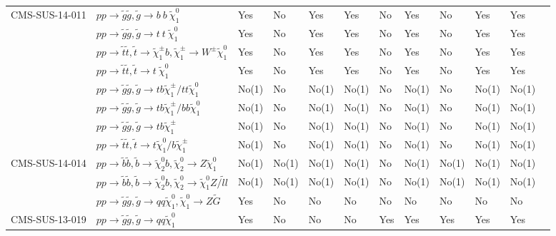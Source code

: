 \documentclass[11pt,A4paper]{article}
\begin{document}
\begin{landscape}
\begin{longtable} {|l|l|l|l|l|l|l|l|l|l|l|l|}
CMS-SUS-14-011 & $pp \rightarrow \tilde{g} \tilde{g}, \tilde{g} \rightarrow b \ b \ \tilde{\chi}_1 ^0 $ & Yes & No & Yes & Yes & No & Yes & No & Yes & Yes & \\
  & $pp \rightarrow \tilde{g} \tilde{g}, \tilde{g}\rightarrow t \ t \ \tilde{\chi}_1 ^0 $ & Yes & No & Yes & Yes & No & Yes & No & Yes & Yes & \\
  & $pp \rightarrow \tilde{t} \tilde{t}, \tilde{t}\rightarrow \tilde{\chi}_1 ^{\pm} b,\tilde{\chi}_1 ^{\pm} \rightarrow W^{\pm} \tilde{\chi}_1 ^0$ & Yes & No & Yes & Yes & No & Yes & No & Yes & Yes & \\
  & $pp \rightarrow \tilde{t} \tilde{t}, \tilde{t}\rightarrow t \ \tilde{\chi}_1 ^0 $ & Yes & No & Yes & Yes & No & Yes & No & Yes & Yes & \\
  & $pp \rightarrow \tilde{g} \tilde{g}, \tilde{g} \rightarrow t b \tilde{\chi}_1 ^{\pm} / t t \tilde{\chi}_1 ^0 $ & No(1) & No & No(1) & No(1) & No & No(1) & No & No(1) & No(1) & \\
 & $pp \rightarrow \tilde{g} \tilde{g}, \tilde{g} \rightarrow t b \tilde{\chi}_1 ^{\pm} / b b \tilde{\chi}_1 ^0 $ & No(1) & No & No(1) & No(1) & No & No(1) & No & No(1) & No(1) & \\
  & $pp \rightarrow \tilde{g} \tilde{g}, \tilde{g} \rightarrow t b \tilde{\chi}_1 ^{\pm} $ & No(1) & No & No(1) & No(1) & No & No(1) & No & No(1) & No(1) & \\
  & $pp \rightarrow \tilde{t} \tilde{t}, \tilde{t} \rightarrow t \tilde{\chi}_1 ^0 / b \tilde{\chi}_1 ^{\pm} $ & No(1) & No & No(1) & No(1) & No & No(1) & No & No(1) & No(1) & \\ \hline
CMS-SUS-14-014 & $pp \rightarrow \tilde{b} \tilde{b}, \tilde{b}\rightarrow \tilde{\chi}_2 ^0 b,\tilde{\chi}_2 ^0 \rightarrow Z \tilde{\chi}_1 ^0$ & No(1) & No(1) & No(1) & No(1) & No & No(1) & No(1) & No(1) & No(1) & \\
  & $pp \rightarrow \tilde{b} \tilde{b}, \tilde{b}\rightarrow \tilde{\chi}_2 ^0 b ,\tilde{\chi}_2 ^0 \rightarrow \tilde{\chi}_1 ^0 Z / \tilde{l}l$ & No(1) & No(1) & No(1) & No(1) & No & No(1) & No(1) & No(1) & No(1) & \\
  & $pp \rightarrow \tilde{g} \tilde{g}, \tilde{g}\rightarrow q q \tilde{\chi}_1 ^0 ,\tilde{\chi}_1 ^0 \rightarrow Z  \tilde{G}$ & Yes & No & No & No & No & No & No & No & No & \\ \hline
CMS-SUS-13-019 & $pp \rightarrow \tilde{g} \tilde{g}, \tilde{g}\rightarrow q q  \tilde{\chi}_1 ^0 $ & Yes & No & No & No & Yes & Yes & Yes & Yes & Yes & \\

\end{longtable}
\end{landscape}
\end{document}
